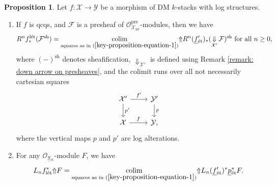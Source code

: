 \documentclass[11pt]{amsart}
\theoremstyle{definition}
\theoremstyle{definition}
\newtheorem{proposition}[theorem]{Proposition}
\DeclareMathOperator{\arrowup}{\!\Uparrow \!}
\DeclareMathOperator{\arrowdown}{\!\Downarrow\!}
\newcommand{\cX}{\mathcal{X}}
\newcommand{\cY}{\mathcal{Y}}
\newcommand{\cal}{\mathcal}
\def\cX{{\cal X}}
\def\cY{{\cal Y}}
\begin{document}
%
\begin{proposition}\label{key proposition}
Let $f\colon \cX\rightarrow \cY$ be a morphism of DM $k$-stacks with log structures. 
\begin{enumerate}
    \item \label{item-1-key proposition} If $f$ is qcqs, and $\mathcal{F}$ is a presheaf of $\mathcal{O}_{\cX_{\text{l\'et}}}^{\text{pre}}$-modules, then we have 
    \begin{equation}\label{equation: fickfickfick} R^{n}f^{\text{l\'et}}_{*}(\mathcal{F}^{\text{sh}})=\underset{\text{squares as in (}\ref{key-proposition-equation-1}\text{)}}{\mathrm{colim}}\arrowup R^{n}(\underline{f}{}'_{\text{\'et}})_{*}(\arrowdown_{\cX'}\mathcal{F})^{\text{sh}}\text{ for all }n\geq 0,\end{equation} %
    where $(-)^{\text{sh}}$ denotes sheafification, $\Downarrow_{\cX'}$ is defined using Remark \ref{remark: down arrow on presheaves}, and the colimit runs over all not necessarily cartesian squares
\begin{equation}\label{key-proposition-equation-1}
\begin{tikzcd}
\cX' \arrow[r, "f'"] \arrow[d, "p'"] & \cY' \arrow[d, "p"] \\
\cX \arrow[r, "f"] & \cY,
\end{tikzcd}      
\end{equation}
 where the vertical maps $p$ and $p'$ are log alterations.
\item \label{item-2-key proposition}
For any $\mathcal{O}_{\underline{\cY}{}_{\text{\'et}}}$-module $F$, we have
\[L_{n}f_{\text{l\'et}}^{*}\arrowup F=\underset{\text{squares as in (}\ref{key-proposition-equation-1}\text{)}}{\mathrm{colim}}\arrowup L_{n}(\underline{f}{}'_{\text{\'et}})^{*}\underline{p}{}_{\text{\'et}}^{*} F.\]
\end{enumerate} 
\end{proposition}
\end{document}
